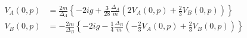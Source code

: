 \begin{equation}
\label{eq:system}
\begin{split}
V_A(0,p)&=\frac{2m}{\Delta_A}\left\{-2ig+\frac{3}{28}\frac{\Delta_A}{m}
\left(2V_A(0,p)+\frac{2}{3}V_B(0,p)\right)\right\}\\
V_B(0,p)&=-\frac{2m}{\Delta_B}\left\{-2ig-\frac{1}{4}\frac{\Delta_B}{m}
\left(-\frac{2}{3}V_A(0,p)+\frac{2}{3}V_B(0,p)\right)\right\}
\end{split}
\end{equation}

